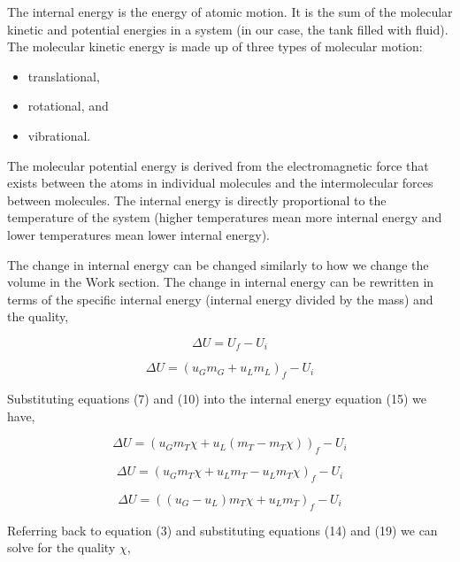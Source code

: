 \documentclass[10pt,parskip=half,
toc=sectionentrywithdots,
bibliography=totocnumbered,
captions=tableheading,numbers=noendperiod]{scrartcl}
\providecommand{\tightlist}{%
  \setlength{\itemsep}{0pt}\setlength{\parskip}{0pt}}
\begin{document}
The internal energy is the energy of atomic motion. It is the sum of the
molecular kinetic and potential energies in a system (in our case, the
tank filled with fluid). The molecular kinetic energy is made up of
three types of molecular motion:

\begin{itemize}
\tightlist
\item
  translational,
\item
  rotational, and
\item
  vibrational.
\end{itemize}

The molecular potential energy is derived from the electromagnetic force
that exists between the atoms in individual molecules and the
intermolecular forces between molecules. The internal energy is directly
proportional to the temperature of the system (higher temperatures mean
more internal energy and lower temperatures mean lower internal energy).

The change in internal energy can be changed similarly to how we change
the volume in the Work section. The change in internal energy can be
rewritten in terms of the specific internal energy (internal energy
divided by the mass) and the quality,

\begin{equation}\Delta U = U_f - U_i\end{equation}

\begin{equation}\Delta U = \left(u_Gm_G + u_Lm_L\right)_f - U_i\end{equation}

Substituting equations (7) and (10) into the internal energy equation
(15) we have,

\begin{equation}\Delta U = \left(u_Gm_T\chi + u_L(m_T - m_T \chi)\right)_f - U_i\end{equation}

\begin{equation}\Delta U = \left( u_G m_T \chi + u_L m_T - u_L m_T \chi \right)_f - U_i\end{equation}

\begin{equation}\Delta U = \left( \left(u_G - u_L \right) m_T \chi + u_L m_T \right)_f - U_i\end{equation}

Referring back to equation (3) and substituting equations (14) and (19)
we can solve for the quality \(\chi\),
\end{document}
